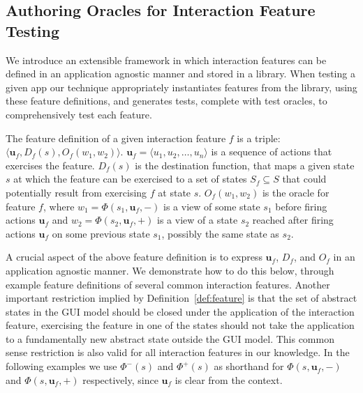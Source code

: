 \subsection{Authoring Oracles for Interaction Feature Testing}
\label{sec:featureDefinition}

We introduce an extensible framework in which interaction features can be defined in an application agnostic manner and stored in a library. When testing a given app our technique appropriately instantiates features from the library, using these feature definitions, and generates tests, complete with test oracles, to comprehensively test each feature.

\begin{mydef}
\label{def:feature}
The feature definition of a given interaction feature $f$ is a triple: $\langle \mathbf{u}_f, D_f(s), O_f(w_1, w_2) \rangle$. %
$\mathbf{u}_f = \langle u_1, u_2, \dots, u_n \rangle$ is a sequence of actions that exercises the feature. $D_f(s)$ is the destination function, that maps a given state $s$ at which the feature can be exercised to a set of states $S_f \subseteq S$ that could potentially result from exercising $f$ at state $s$. $O_f(w_1, w_2)$ is the oracle for feature $f$, where $w_1 = \Phi(s_1, \mathbf{u}_f, -)$ is a view of some state $s_1$
before firing actions $\mathbf{u}_f$ and $w_2=\Phi(s_2, \mathbf{u}_f, +)$ is a view of a state $s_2$ reached after firing actions $\mathbf{u}_f$ on some previous state $s_1$, possibly the same state as $s_2$.
\end{mydef}

A crucial aspect of the above feature definition is to express $\mathbf{u}_f$, $D_f$, and $O_f$ in an application agnostic manner. We demonstrate how to do this below, through example feature definitions of several common interaction features. Another important restriction implied by Definition~\ref{def:feature} is that the set of abstract states in the GUI model should be closed under the application of the interaction feature, \ie exercising the feature in one of the states should not take the application to a fundamentally new abstract state outside the GUI model. This common sense restriction is also valid for all interaction features in our knowledge. In the following examples we use $\Phi^-(s)$ and $\Phi^+(s)$ as shorthand for $\Phi(s, \mathbf{u}_f, -)$ and $\Phi(s, \mathbf{u}_f, +)$ respectively, since $\mathbf{u}_f$ is clear from the context.

